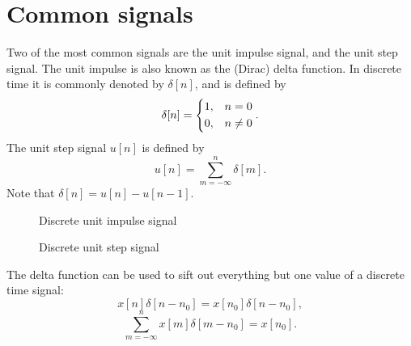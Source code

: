 \section{Common signals}

Two of the most common signals are the unit impulse signal, and the unit step signal. The unit impulse is also known as the (Dirac) delta function. In discrete time it is commonly denoted by $\delta[n]$, and is defined by
\[\delta[n] =
\begin{dcases}
    1, & n = 0 \\
    0, & n \neq 0
\end{dcases}.\] The unit step signal $u[n]$ is defined by
\[u[n] = \sum_{m=-\infty}^{n}\delta[m].\] Note that $\delta[n] = u[n] - u[n-1]$.

\begin{figure}
    \centering
\caption{Discrete unit impulse signal}
\label{fig:discrete-unit-impulse}
\end{figure}

\begin{figure}
    \centering
\caption{Discrete unit step signal}
\label{fig:discrete-unit-step}
\end{figure}

The delta function can be used to sift out everything but one value of a discrete time signal:
\[x[n]\delta[n-n_0] = x[n_0]\delta[n-n_0],\]
\[\sum_{m=-\infty}^n x[m]\delta[m-n_0] = x[n_0].\]

